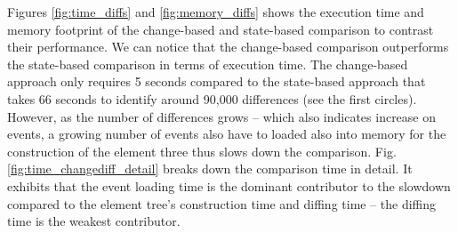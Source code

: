 \documentclass{llncs}
\begin{document}
Figures \ref{fig:time_diffs} and \ref{fig:memory_diffs} shows the execution time and memory footprint of the change-based and state-based comparison to contrast their performance. We can notice that the change-based comparison outperforms the state-based comparison in terms of execution time. The change-based approach only requires 5 seconds compared to the state-based approach that takes 66 seconds to identify around 90,000 differences (see the first circles). However, as the number of differences grows -- which also indicates increase on events, a growing number of events also have to loaded also into memory for the construction of the element three thus slows down the comparison. Fig. \ref{fig:time_changediff_detail} breaks down the comparison time in detail. It exhibits that the event loading time is the dominant contributor to the slowdown compared to the element tree's construction time and diffing time -- the diffing time is the weakest contributor. 
\end{document}
